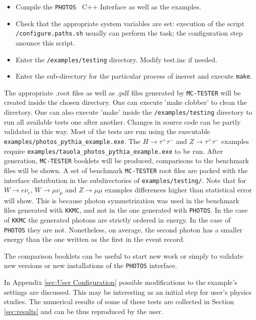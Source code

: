 \documentclass[]{Photos_interface_design}
\begin{document}
\begin{itemize}
  \item Compile the {\tt PHOTOS } C++ Interface as well as the examples. 
 \item  Check that the appropriate system variables are set: execution of  the script \\
{\tt /configure.paths.sh} usually can perform the task; the configuration step 
anounce  this script.
  \item Enter the {\tt /examples/testing} directory. Modify test.inc if needed.
  \item Enter the sub-directory for the particular process of inerest
and execute {\tt make}.
\end{itemize}

The appropriate .root files as well as .pdf files generated by {\tt MC-TESTER}
will be created inside the chosen directory. One can execute 'make clobber' to
clean the directory. One can also execute 'make' inside the {\tt /examples/testing}
directory to run all available tests one after another. Changes in source
code  can  be partly validated in this way.
Most of the tests are run using the executable {\tt examples/photos\_pythia\_example.exe}. The 
 $H \rightarrow \tau^+ \tau^-$ and $Z \rightarrow \tau^+ \tau^-$ examples 
require
{\tt examples/tauola\_photos\_pythia\_example.exe} to be run.
After generation, {\tt MC-TESTER} booklets will be produced,
 comparisons to the benchmark files will be shown.
A set of benchmark {\tt MC-TESTER} root files are packed with the interface
distribution in the subdirectories of {\tt examples/testing/}.
Note that for $W \rightarrow e \nu_e$, 
$W \rightarrow \mu \nu_\mu$ and $Z \rightarrow \mu \mu$
examples   differences higher than statistical error will show. 
This is because  photon symmetrization
was used in the benchmark files generated with {\tt KKMC}, and not in the one 
generated with {\tt PHOTOS}.
In the case of {\tt KKMC} the generated photons are strictly ordered in energy. 
In the case of {\tt PHOTOS} they are not. Nonetheless, on average, 
the second photon has a smaller energy than the one written as the first
in the event record.


The comparison booklets can be useful 
to start new work or simply to 
validate new versions or new installations of the {\tt PHOTOS} interface.

In Appendix \ref{sec:User Configuration} possible modifications to the  
example's settings are discussed. This may be interesting as an initial step for user's 
physics studies.  The numerical results of some of these tests are collected in Section \ref{sec:results}
and can be thus reproduced by the user.
\end{document}
